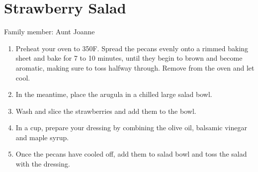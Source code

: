 \chapter{Strawberry Salad}
\label{ch:strawberrysalad}

Family member: Aunt Joanne



\begin{enumerate}
    \item Preheat your oven to 350\degree F. Spread the pecans evenly onto a rimmed baking sheet and bake for 7 to 10 minutes, until they begin to brown and become aromatic, making sure to toss halfway through. Remove from the oven and let cool.
    \item In the meantime, place the arugula in a chilled large salad bowl.
    \item Wash and slice the strawberries and add them to the bowl.
    \item In a cup, prepare your dressing by combining the olive oil, balsamic vinegar and maple syrup.
    \item Once the pecans have cooled off, add them to salad bowl and toss the salad with the dressing.
\end{enumerate}